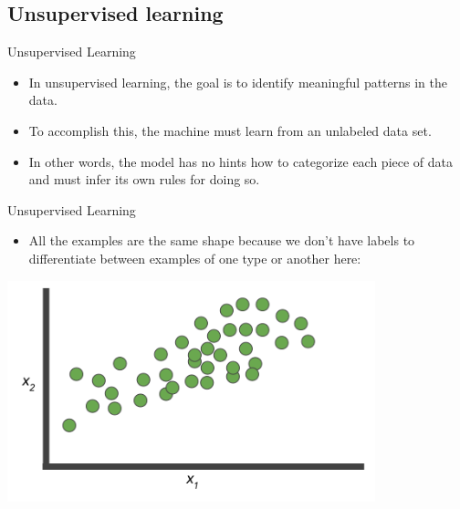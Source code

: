 \documentclass{beamer}
\begin{document}

\subsection{Unsupervised learning}

\begin{frame}{Unsupervised Learning}

\begin{itemize}

\item In unsupervised learning, the goal is to identify meaningful patterns in the data. 

\item To accomplish this, the machine must learn from an unlabeled data set. 

\item In other words, the model has no hints how to categorize each piece of data and must infer its own rules for doing so.

\end{itemize}

\end{frame}


\begin{frame}{Unsupervised Learning}

\begin{itemize}
\item All the examples are the same shape because we don't have labels to differentiate between examples of one type or another here:
\end{itemize}

\medskip

\includegraphics[width=0.8\textwidth]{images/Graph4.png}

\end{frame}

\end{document}
